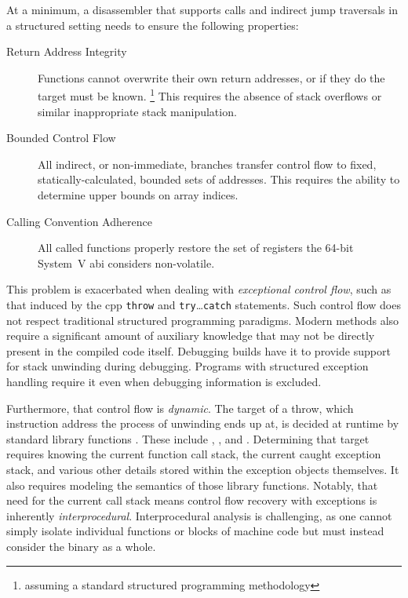At a minimum, a disassembler that supports calls and indirect jump traversals in a structured setting needs to ensure the following properties:
\begin{description}
  \item[Return Address Integrity] Functions cannot overwrite their own return addresses, or if they do the target must be known.%
  \footnote{assuming a standard structured programming methodology}
  This requires the absence of stack overflows or similar inappropriate stack manipulation.
  \item[Bounded Control Flow] All indirect, or non-immediate, branches transfer control flow to fixed, statically-calculated, bounded sets of addresses. This requires the ability to determine upper bounds on array indices.
  \item[Calling Convention Adherence] All called functions properly restore the set of registers the 64-bit System~V \ac{abi} considers non-volatile.
\end{description}

This problem is exacerbated when dealing with \emph{exceptional control flow}, such as that induced by the \gls{cpp} \lstinline|throw| and \lstinline|try|\dots\lstinline|catch| statements.
Such control flow does not respect traditional structured programming paradigms.
Modern methods also require a significant amount of auxiliary knowledge that may not be directly present in the compiled code itself.
Debugging builds have it to provide support for stack unwinding during debugging.
Programs with structured exception handling require it even when debugging information is excluded.

Furthermore, that control flow is \emph{dynamic}.
The target of a throw, which instruction address the process of unwinding ends up at, is decided at runtime by standard library functions \autocite{cxxEhAbi}.
These include , ,
and .
Determining that target requires knowing the current function call stack, the current caught exception stack, and various other details stored within the exception objects themselves.
It also requires modeling the semantics of those library functions.
Notably, that need for the current call stack means control flow recovery with exceptions is inherently \emph{interprocedural}.
Interprocedural analysis is challenging, as one cannot simply isolate individual functions or blocks of machine code but must instead consider the binary as a whole.

